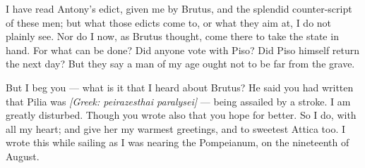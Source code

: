  I have read Antony's edict, given me by Brutus, and the splendid counter-script of these men; but what those edicts come to, or what they aim at, I do not plainly see. Nor do I now, as Brutus thought, come there to take the state in hand. For what can be done? Did anyone vote with Piso? Did Piso himself return the next day? But they say a man of my age ought not to be far from the grave.

 But I beg you --- what is it that I heard about Brutus? He said you had written that Pilia was \textit{[Greek: peirazesthai paralysei]} --- being assailed by a stroke. I am greatly disturbed. Though you wrote also that you hope for better. So I do, with all my heart; and give her my warmest greetings, and to sweetest Attica too. I wrote this while sailing as I was nearing the Pompeianum, on the nineteenth of August.
